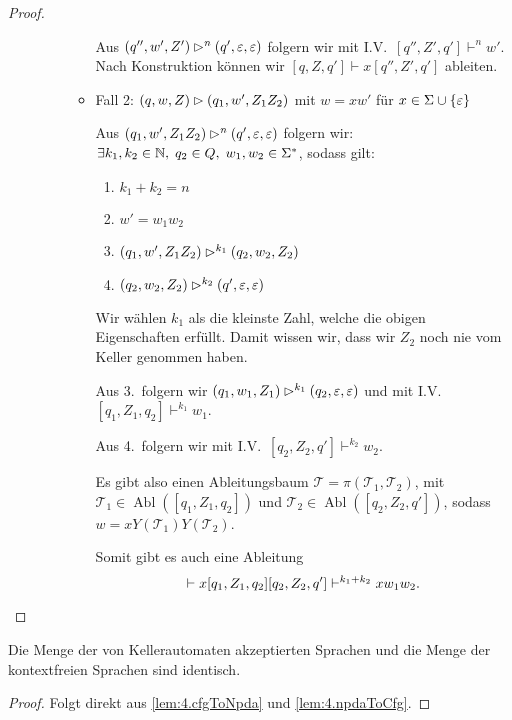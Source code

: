 \begin{proof}
\begin{description}
\begin{itemize}
\begin{itemize}
      Aus $(q'', w',Z')\rhd^n (q',\varepsilon,\varepsilon)$ folgern wir mit I.V.\
      $[q'', Z',q']\vdash^n w'$.
      Nach Konstruktion können wir $[q,Z,q']\vdash x [q'', Z',q']$ ableiten.

      
      \item Fall 2: $(q,w,Z)\rhd (q_1, w',Z_1Z_2)$ mit $w=xw'$ für $x\in\Sigma\cup\{\varepsilon\}$

            Aus $(q_1, w',Z_1Z_2)\rhd^n (q',\varepsilon,\varepsilon)$ folgern wir:
      $\exists k_1,k_2\in\mathbb{N}, \; q_2\in Q, \; w_1,w_2\in \Sigma^*$, sodass gilt:
      \begin{enumerate}
      \item $k_1+k_2=n$
      \item $w'=w_1w_2$
      \item $(q_1, w',Z_1Z_2)\rhd^{k_1} (q_2, w_2,Z_2)$
      \item $(q_2, w_2,Z_2)\rhd^{k_2} (q',\varepsilon,\varepsilon)$
      \end{enumerate}
      Wir wählen $k_1$ als die kleinste Zahl, welche die obigen Eigenschaften erfüllt.
      Damit wissen wir, dass wir $Z_2$ noch nie vom Keller genommen haben.
      
      Aus 3.\ folgern wir $(q_1, w_1,Z_1)\rhd^{k_1} (q_2, \varepsilon,\varepsilon)$ und mit I.V.\
      $[q_1, Z_1, q_2] \vdash^{k_1} w_1$.
      
      Aus 4.\ folgern wir mit I.V.\ $[q_2, Z_2, q'] \vdash^{k_2} w_2$.
      
      Es gibt also einen Ableitungsbaum $\mathcal{T} = \pi(\mathcal{T}_1,\mathcal{T}_2)$, mit $\mathcal{T}_1 \in \operatorname{Abl}([q_1, Z_1, q_2])$ und $\mathcal{T}_2 \in \operatorname{Abl}([q_2, Z_2, q'])$, sodass $w = xY(\mathcal{T}_1)Y(\mathcal{T}_2)$.
      
      Somit gibt es auch eine Ableitung
      \begin{equation*}
      [q, Z, q'] \vdash x[q_1,Z_1,q_2][q_2, Z_2, q'] \vdash^{k_1+k_2} xw_1w_2. \qedhere
      \end{equation*}
      \end{itemize}
    	 
    \end{itemize}
    \end{description}

\end{proof}

\begin{Satz}
Die Menge der von Kellerautomaten akzeptierten Sprachen und die Menge der kontextfreien Sprachen sind identisch.
\end{Satz}
\begin{proof}
Folgt direkt aus \autoref{lem:4.cfgToNpda} und \autoref{lem:4.npdaToCfg}.
\end{proof}

